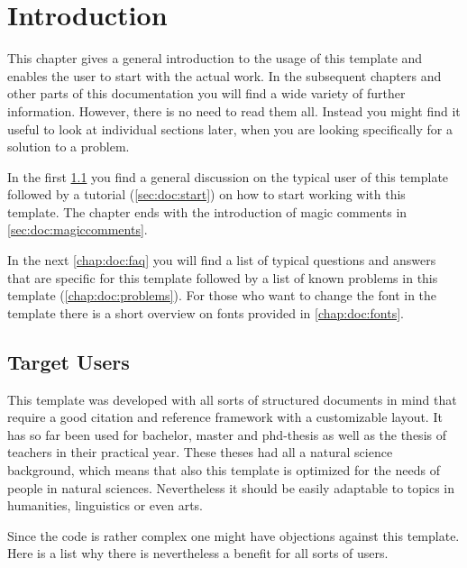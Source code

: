 \chapter{Introduction}

This chapter gives a general introduction to the usage of this template and enables the user to start with the actual work. 
In the subsequent chapters and other parts of this documentation you will find a wide variety of further information. However, there is no need to read them all. Instead you might find it useful to look at individual sections later, when you are looking specifically for a solution to a problem.

In the first \cref{sec:doc:targetusers} you find a general discussion on the typical user of this template followed by a tutorial (\cref{sec:doc:start}) on how to start working with this template. The chapter ends with the introduction of magic comments in \cref{sec:doc:magiccomments}.

In the next \cref{chap:doc:faq} you will find a list of typical questions and answers that are specific for this template followed by a list of known problems in this template (\cref{chap:doc:problems}). For those who want to change the font in the template there is a short overview on fonts provided in \cref{chap:doc:fonts}.

\section{Target Users}
\label{sec:doc:targetusers}

This template was developed with all sorts of structured documents in mind that require a good citation and reference framework with a customizable layout. It has so far been used for bachelor, master and phd-thesis as well as the thesis of teachers in their practical year. These theses had all a natural science background, which means that also this template is optimized for the needs of people in natural sciences. Nevertheless it should be easily adaptable to topics in humanities, linguistics or even arts.

Since the code is rather complex one might have objections against this template. Here is a list why there is nevertheless a benefit for all sorts of users.

